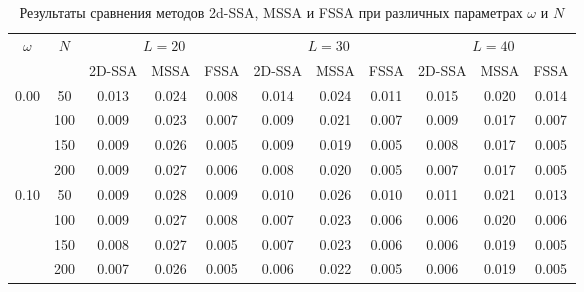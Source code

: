 \documentclass[12pt, specialist, subf
]{disser}
\theoremstyle{definition}
\begin{document}
\begin{table}[H]
	\caption{Результаты сравнения методов 2d-SSA, MSSA и FSSA при различных параметрах $\omega$ и $N$}
	\centering
	\label{tab:sim_fssa}
	\begin{tabular}{c|c|ccc|ccc|ccc}
		\toprule
		\multicolumn{1}{c|}{$\omega$} & \multicolumn{1}{c|}{$N$} & \multicolumn{3}{c|}{$L=20$} & \multicolumn{3}{c|}{$L=30$} & \multicolumn{3}{c}{$L=40$}                                                   \\
		                              &                          & 2D-SSA                      & MSSA                        & FSSA                       & 2D-SSA & MSSA  & FSSA  & 2D-SSA & MSSA  & FSSA  \\
		\midrule
		\multirow{4}{*}{0.00}         & 50                       & 0.013                       & 0.024                       & 0.008                      & 0.014  & 0.024 & 0.011 & 0.015  & 0.020 & 0.014 \\
		                              & 100                      & 0.009                       & 0.023                       & 0.007                      & 0.009  & 0.021 & 0.007 & 0.009  & 0.017 & 0.007 \\
		                              & 150                      & 0.009                       & 0.026                       & 0.005                      & 0.009  & 0.019 & 0.005 & 0.008  & 0.017 & 0.005 \\
		                              & 200                      & 0.009                       & 0.027                       & 0.006                      & 0.008  & 0.020 & 0.005 & 0.007  & 0.017 & 0.005 \\
		\midrule
		\multirow{4}{*}{0.10}         & 50                       & 0.009                       & 0.028                       & 0.009                      & 0.010  & 0.026 & 0.010 & 0.011  & 0.021 & 0.013 \\
		                              & 100                      & 0.009                       & 0.027                       & 0.008                      & 0.007  & 0.023 & 0.006 & 0.006  & 0.020 & 0.006 \\
		                              & 150                      & 0.008                       & 0.027                       & 0.005                      & 0.007  & 0.023 & 0.006 & 0.006  & 0.019 & 0.005 \\
		                              & 200                      & 0.007                       & 0.026                       & 0.005                      & 0.006  & 0.022 & 0.005 & 0.006  & 0.019 & 0.005 \\

\end{tabular}
\end{table}
\end{document}
